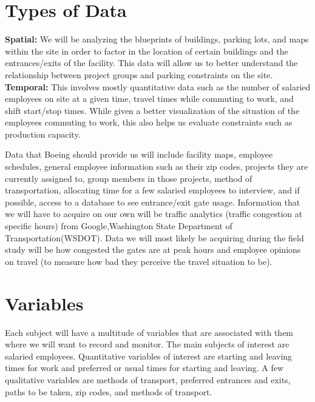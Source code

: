 \documentclass[onecolumn, draftclsnofoot,10pt, compsoc]{IEEEtran}
\begin{document}
\section{Types of Data}
\textbf{Spatial:} We will be analyzing the blueprints of buildings, parking lots, and maps within the site in order to factor in the location of certain buildings and the entrances/exits of the facility. 
This data will allow us to better understand the relationship between project groups and parking constraints on the site. \\
\textbf{Temporal:} This involves mostly quantitative data such as the number of salaried employees on site at a given time, travel times while commuting to work, and shift start/stop times. 
While given a better visualization of the situation of the employees commuting to work, this also helps us evaluate constraints such as production capacity. 
\par\null\par

\noindent Data that Boeing should provide us will include facility maps, employee schedules, general employee information such as their zip codes, projects they are currently assigned to, group members in those projects, method of transportation, allocating time for a few salaried employees to interview, and if possible, access to a database to see entrance/exit gate usage. 
Information that we will have to acquire on our own will be traffic analytics (traffic congestion at specific hours) from Google,Washington State Department of Transportation(WSDOT). 
Data we will most likely be acquiring during the field study will be how congested the gates are at peak hours and employee opinions on travel (to measure how bad they perceive the travel situation to be).

\section{Variables}
\indent \indent Each subject will have a multitude of variables that are associated with them where we will want to record and monitor. 
The main subjects of interest are salaried employees. 
Quantitative variables of interest are starting and leaving times for work and preferred or usual times for starting and leaving. 
A few qualitative variables are methods of transport, preferred entrances and exits, paths to be taken, zip codes, and methods of transport.
\end{document}

